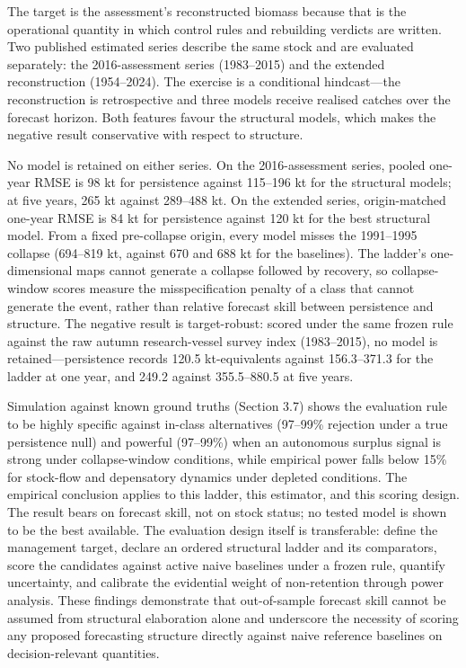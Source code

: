 \documentclass[11pt]{article}
\begin{document}
The target is the assessment's reconstructed biomass because that is the
operational quantity in which control rules and rebuilding verdicts are
written. Two published estimated series describe the same stock and are
evaluated separately: the 2016-assessment series (1983--2015) and the
extended reconstruction (1954--2024). The exercise is a conditional
hindcast---the reconstruction is retrospective and three models receive
realised catches over the forecast horizon. Both features favour the
structural models, which makes the negative result conservative with
respect to structure.

No model is retained on either series. On the 2016-assessment series,
pooled one-year RMSE is 98 kt for persistence against 115--196 kt for
the structural models; at five years, 265 kt against 289--488 kt. On the
extended series, origin-matched one-year RMSE is 84 kt for persistence
against 120 kt for the best structural model. From a fixed pre-collapse
origin, every model misses the 1991--1995 collapse (694--819 kt, against
670 and 688 kt for the baselines). The ladder's one-dimensional maps
cannot generate a collapse followed by recovery, so collapse-window
scores measure the misspecification penalty of a class that cannot
generate the event, rather than relative forecast skill between
persistence and structure. The negative result is target-robust: scored
under the same frozen rule against the raw autumn research-vessel survey
index (1983--2015), no model is retained---persistence records 120.5
kt-equivalents against 156.3--371.3 for the ladder at one year, and
249.2 against 355.5--880.5 at five years.

Simulation against known ground truths (Section 3.7) shows the
evaluation rule to be highly specific against in-class alternatives
(97--99\% rejection under a true persistence null) and powerful
(97--99\%) when an autonomous surplus signal is strong under
collapse-window conditions, while empirical power falls below 15\% for
stock-flow and depensatory dynamics under depleted conditions. The
empirical conclusion applies to this ladder, this estimator, and this
scoring design. The result bears on forecast skill, not on stock status;
no tested model is shown to be the best available. The evaluation design
itself is transferable: define the management target, declare an ordered
structural ladder and its comparators, score the candidates against
active naive baselines under a frozen rule, quantify uncertainty, and
calibrate the evidential weight of non-retention through power analysis.
These findings demonstrate that out-of-sample forecast skill cannot be
assumed from structural elaboration alone and underscore the necessity
of scoring any proposed forecasting structure directly against naive
reference baselines on decision-relevant quantities.
\end{document}
